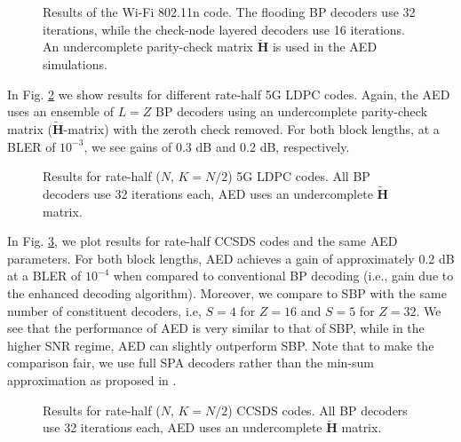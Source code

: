 \documentclass[conference]{IEEEtran}
\newcommand\new[1]{#1}
\begin{document}
\begin{NoHyper}
\begin{figure} [t]
	\centering
	\resizebox{\columnwidth}{!}{}
	\caption{\footnotesize Results of the Wi-Fi 802.11n code. The flooding BP decoders use 32 iterations, while the check-node layered decoders use 16 iterations. An undercomplete parity-check matrix $\tilde{\mathbf{H}}$ is used in the AED simulations.}
	\label{fig:wifi_results}
\end{figure}


In Fig. \ref{fig:5g132_results} we show results for different rate-half 5G LDPC codes. Again, the \ac{AED} uses an ensemble of $L=Z$ \ac{BP} decoders using an undercomplete parity-check matrix ($\tilde{\mathbf{H}}$-matrix) with the zeroth check removed. For both block lengths, at a \ac{BLER} of $10^{-3}$, we see gains of 0.3 dB and 0.2 dB, respectively.

\begin{figure} 
	\centering
	\resizebox{\columnwidth}{!}{}
	\vspace{-0.3cm}
	\caption{\footnotesize Results for rate-half ($N$, $K=N/2$) 5G LDPC codes. All BP decoders use 32 iterations each, AED uses an  undercomplete $\tilde{\mathbf{H}}$ matrix.}
	\label{fig:5g132_results}
\end{figure}

In Fig. \ref{fig:ccsds_results}, we plot results for rate-half CCSDS codes and the same \ac{AED} parameters. For both block lengths, \ac{AED} achieves a gain of approximately 0.2 dB at a \ac{BLER} of $10^{-4}$ when compared to conventional \ac{BP} decoding (i.e., gain due to the enhanced decoding algorithm). \new{Moreover, we compare to \ac{SBP} with the same number of constituent decoders, i.e, $S=4$ for $Z=16$ and $S=5$ for $Z=32$. We see that the performance of \ac{AED} is very similar to that of \ac{SBP}, while in the higher SNR regime, \ac{AED} can slightly outperform \ac{SBP}. Note that to make the comparison fair, we use full \ac{SPA} decoders rather than the min-sum approximation as proposed in \cite{WehnSaturatedMinSum}.}

\begin{figure} 
	\centering
	\resizebox{\columnwidth}{!}{}
	\vspace{-0.15cm}
	\caption{\footnotesize Results for rate-half ($N$, $K=N/2$) CCSDS codes. All BP decoders use 32 iterations each, AED uses an  undercomplete $\tilde{\mathbf{H}}$ matrix.}
	\label{fig:ccsds_results}
	\vspace{-0.4cm}
\end{figure}


\end{NoHyper}
\end{document}
